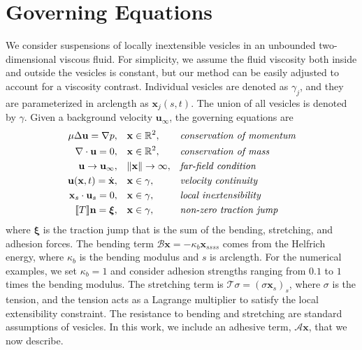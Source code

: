 \documentclass[prf,superscriptaddress,showpacs]{revtex4-1}
\renewcommand{\AA}{\mathcal{A}}
\newcommand{\BB}{\mathcal{B}}
\newcommand{\nn}{\mathbf{n}}
\newcommand{\RR}{\mathbb{R}}
\newcommand{\TT}{\mathcal{T}}
\newcommand{\uu}{\mathbf{u}}
\newcommand{\xx}{\mathbf{x}}
\newcommand{\xxi}{\boldsymbol{\xi}}
\begin{document}
\section{Governing Equations \label{sec:ge}}
We consider suspensions of locally inextensible vesicles in an unbounded
two-dimensional viscous fluid.  For simplicity, we assume the fluid
viscosity both inside and outside the vesicles is constant, but our
method can be easily adjusted to account for a viscosity contrast.
Individual vesicles are denoted as $\gamma_j$, and they are
parameterized in arclength as $\xx_j(s,t)$.  The union of all vesicles
is denoted by $\gamma$.  Given a background velocity $\uu_\infty$, the
governing equations are
\begin{equation*}
\begin{aligned}
  \mu \Delta \uu = \nabla p, \quad &\xx \in \RR^2,
    &&\mbox{\em conservation of momentum} \\
  \nabla \cdot \uu = 0, \quad &\xx \in \RR^2, 
    &&\mbox{\em conservation of mass} \\
  \uu \rightarrow \uu_\infty, \quad &\|\xx\| \rightarrow \infty,
    &&\mbox{\em far-field condition} \\
  \uu(\xx,t) = \dot{\xx}, \quad &\xx \in \gamma,
    &&\mbox{\em velocity continuity} \\
  \xx_s \cdot \uu_s =0, \quad &\xx \in \gamma,
    &&\mbox{\em local inextensibility} \\
  \llbracket T \rrbracket \nn = \xxi, \quad &\xx \in \gamma,
    &&\mbox{\em non-zero traction jump}
\end{aligned}
\end{equation*}
where $\xxi$ is the traction jump that is the sum of the bending,
stretching, and adhesion forces.  The bending term $\BB \xx = -\kappa_b
\xx_{ssss}$ comes from the Helfrich energy, where $\kappa_b$ is the
bending modulus and $s$ is arclength.  For the numerical examples, we
set $\kappa_b = 1$ and consider adhesion strengths ranging from $0.1$ to
$1$ times the bending modulus.  The stretching term is $\TT \sigma  =
(\sigma \xx_s)_s$, where $\sigma$ is the tension, and the tension acts
as a Lagrange multiplier to satisfy the local extensibility constraint.
The resistance to bending and stretching are standard assumptions of
vesicles.  In this work, we include an adhesive term, $\AA \xx$, that we
now describe.

\end{document}
